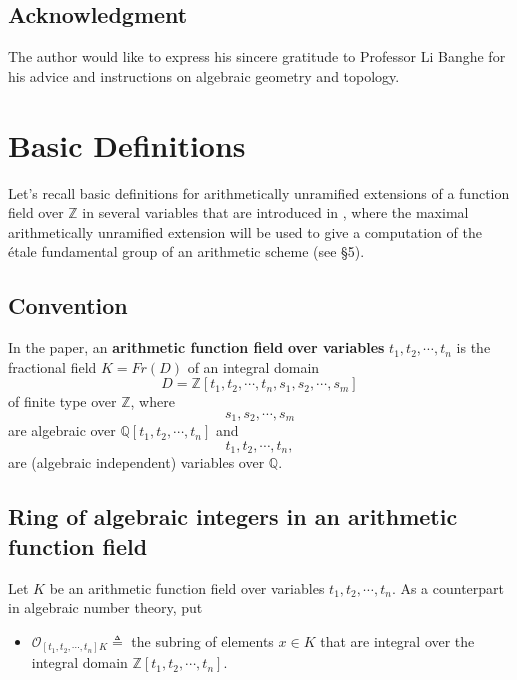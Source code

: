 \documentclass{amsart}
\theoremstyle{definition}
\numberwithin{equation}{section}
\begin{document}
\subsection*{Acknowledgment}

\quad The author would like to express his sincere gratitude to Professor Li
Banghe for his advice and instructions on algebraic geometry and topology.

\section{Basic Definitions}

Let's recall basic definitions for arithmetically unramified extensions of a function field over $\mathbb{Z}$ in several variables that are introduced in
\cite{an4}, where the maximal arithmetically unramified extension will be used to give a computation of the \'{e}tale fundamental group of an arithmetic
scheme (see \S 5).


\subsection{Convention}

In the paper, an \textbf{arithmetic function field} \textbf{over variables} $t_{1},t_{2},\cdots, t_{n}$ is the fractional field $K=Fr(D)$ of an integral
domain
\begin{equation*}
D=\mathbb{Z}[t_{1},t_{2},\cdots, t_{n},s_{1},s_{2},\cdots, s_{m}]
\end{equation*}
of finite type over $\mathbb{Z}$, where
\begin{equation*}
s_{1},s_{2},\cdots, s_{m}
\end{equation*}
are algebraic over $\mathbb{Q}[t_{1},t_{2},\cdots, t_{n}]$ and
\begin{equation*}
t_{1},t_{2},\cdots, t_{n},
\end{equation*}
are (algebraic independent) variables over $\mathbb{Q}$.

\subsection{Ring of algebraic integers in an arithmetic function field}

Let $K$ be an arithmetic function field over variables $t_{1},t_{2},\cdots,
t_{n}$. As a counterpart in algebraic number theory, put
\begin{itemize}
\item $\mathcal{O}_{[t_{1},t_{2},\cdots, t_{n}]K}\triangleq$ the subring of
elements $x\in K$ that are integral over the integral domain $\mathbb{Z}[t_{1},t_{2},\cdots, t_{n}]$.
\end{itemize}
\end{document}
